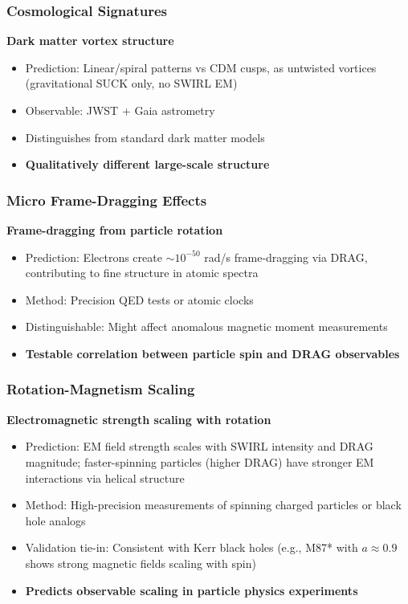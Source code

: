\subsubsection{Cosmological Signatures}
\textbf{Dark matter vortex structure}
\begin{itemize}
\item Prediction: Linear/spiral patterns vs CDM cusps, as untwisted vortices (gravitational SUCK only, no SWIRL EM)
\item Observable: JWST + Gaia astrometry
\item Distinguishes from standard dark matter models
\item \textbf{Qualitatively different large-scale structure}
\end{itemize}

\subsubsection{Micro Frame-Dragging Effects}
\textbf{Frame-dragging from particle rotation}
\begin{itemize}
\item Prediction: Electrons create $\sim 10^{-50}$ rad/s frame-dragging via DRAG, contributing to fine structure in atomic spectra
\item Method: Precision QED tests or atomic clocks
\item Distinguishable: Might affect anomalous magnetic moment measurements
\item \textbf{Testable correlation between particle spin and DRAG observables}
\end{itemize}

\subsubsection{Rotation-Magnetism Scaling}
\textbf{Electromagnetic strength scaling with rotation}
\begin{itemize}
\item Prediction: EM field strength scales with SWIRL intensity and DRAG magnitude; faster-spinning particles (higher DRAG) have stronger EM interactions via helical structure
\item Method: High-precision measurements of spinning charged particles or black hole analogs
\item Validation tie-in: Consistent with Kerr black holes (e.g., M87* with $a \approx 0.9$ shows strong magnetic fields scaling with spin)
\item \textbf{Predicts observable scaling in particle physics experiments}
\end{itemize}

